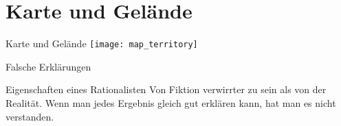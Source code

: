 \section{Karte und Gelände}


\begin{frame}[c]{Karte und Gelände}
    \Large
    \pause
    \texttt{[image: map\_territory]}
\end{frame}


\begin{frame}[c]{Falsche Erklärungen}
\end{frame}


\begin{frame}[c]{Eigenschaften eines Rationalisten}
    \Large
    \pause
    Von Fiktion verwirrter zu sein als von der Realität.
    \newline
    \newline
    \pause
    Wenn man jedes Ergebnis gleich gut erklären kann, hat man es nicht verstanden.
\end{frame}



